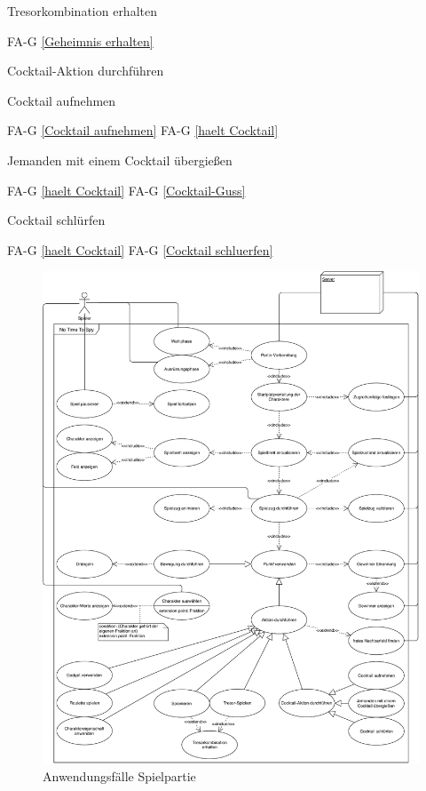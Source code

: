 Tresorkombination erhalten

FA-G \ref{Geheimnis erhalten} %

Cocktail-Aktion durchführen

Cocktail aufnehmen

FA-G \ref{Cocktail aufnehmen} %
FA-G \ref{haelt Cocktail} %

Jemanden mit einem Cocktail übergießen

FA-G \ref{haelt Cocktail} %
FA-G \ref{Cocktail-Guss} %

Cocktail schlürfen

FA-G \ref{haelt Cocktail} %
FA-G \ref{Cocktail schluerfen} %



\begin{figure}
  \centering
  \includegraphics[width=\textwidth]{Meilenstein02/use_case_gamesession.pdf}
  \caption{Anwendungsfälle Spielpartie}
\end{figure}